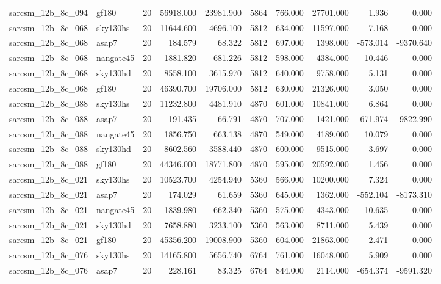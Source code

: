 \documentclass{article}
\begin{document}
\begin{longtable}{llrrrrrrrr}
sarcsm\_12b\_8c\_094 & gf180 & 20 & 56918.000 & 23981.900 & 5864 & 766.000 & 27701.000 & 1.936 & 0.000 \\
sarcsm\_12b\_8c\_068 & sky130hs & 20 & 11644.600 & 4696.100 & 5812 & 634.000 & 11597.000 & 7.168 & 0.000 \\
sarcsm\_12b\_8c\_068 & asap7 & 20 & 184.579 & 68.322 & 5812 & 697.000 & 1398.000 & -573.014 & -9370.640 \\
sarcsm\_12b\_8c\_068 & nangate45 & 20 & 1881.820 & 681.226 & 5812 & 598.000 & 4384.000 & 10.446 & 0.000 \\
sarcsm\_12b\_8c\_068 & sky130hd & 20 & 8558.100 & 3615.970 & 5812 & 640.000 & 9758.000 & 5.131 & 0.000 \\
sarcsm\_12b\_8c\_068 & gf180 & 20 & 46390.700 & 19706.000 & 5812 & 630.000 & 21326.000 & 3.050 & 0.000 \\
sarcsm\_12b\_8c\_088 & sky130hs & 20 & 11232.800 & 4481.910 & 4870 & 601.000 & 10841.000 & 6.864 & 0.000 \\
sarcsm\_12b\_8c\_088 & asap7 & 20 & 191.435 & 66.791 & 4870 & 707.000 & 1421.000 & -671.974 & -9822.990 \\
sarcsm\_12b\_8c\_088 & nangate45 & 20 & 1856.750 & 663.138 & 4870 & 549.000 & 4189.000 & 10.079 & 0.000 \\
sarcsm\_12b\_8c\_088 & sky130hd & 20 & 8602.560 & 3588.440 & 4870 & 600.000 & 9515.000 & 3.697 & 0.000 \\
sarcsm\_12b\_8c\_088 & gf180 & 20 & 44346.000 & 18771.800 & 4870 & 595.000 & 20592.000 & 1.456 & 0.000 \\
sarcsm\_12b\_8c\_021 & sky130hs & 20 & 10523.700 & 4254.940 & 5360 & 566.000 & 10200.000 & 7.324 & 0.000 \\
sarcsm\_12b\_8c\_021 & asap7 & 20 & 174.029 & 61.659 & 5360 & 645.000 & 1362.000 & -552.104 & -8173.310 \\
sarcsm\_12b\_8c\_021 & nangate45 & 20 & 1839.980 & 662.340 & 5360 & 575.000 & 4343.000 & 10.635 & 0.000 \\
sarcsm\_12b\_8c\_021 & sky130hd & 20 & 7658.880 & 3233.100 & 5360 & 563.000 & 8711.000 & 5.439 & 0.000 \\
sarcsm\_12b\_8c\_021 & gf180 & 20 & 45356.200 & 19008.900 & 5360 & 604.000 & 21863.000 & 2.471 & 0.000 \\
sarcsm\_12b\_8c\_076 & sky130hs & 20 & 14165.800 & 5656.740 & 6764 & 761.000 & 16048.000 & 5.909 & 0.000 \\
sarcsm\_12b\_8c\_076 & asap7 & 20 & 228.161 & 83.325 & 6764 & 844.000 & 2114.000 & -654.374 & -9591.320 \\

\end{longtable}
\end{document}
